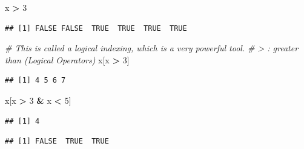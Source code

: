 \documentclass[]{book}
\newenvironment{Shaded}{\begin{snugshade}}{\end{snugshade}}
\newcommand{\CommentTok}[1]{\textcolor[rgb]{0.56,0.35,0.01}{\textit{#1}}}
\newcommand{\DecValTok}[1]{\textcolor[rgb]{0.00,0.00,0.81}{#1}}
\newcommand{\KeywordTok}[1]{\textcolor[rgb]{0.13,0.29,0.53}{\textbf{#1}}}
\newcommand{\NormalTok}[1]{#1}
\newcommand{\OperatorTok}[1]{\textcolor[rgb]{0.81,0.36,0.00}{\textbf{#1}}}
\newcommand{\StringTok}[1]{\textcolor[rgb]{0.31,0.60,0.02}{#1}}
\begin{document}
\begin{Shaded}
\begin{Highlighting}[]
\NormalTok{x }\OperatorTok{>}\StringTok{ }\DecValTok{3}
\end{Highlighting}
\end{Shaded}

\begin{verbatim}
## [1] FALSE FALSE  TRUE  TRUE  TRUE  TRUE
\end{verbatim}

\begin{Shaded}
\begin{Highlighting}[]
\CommentTok{# This is called a logical indexing, which is a very powerful tool.}
\CommentTok{# > : greater than (Logical Operators)}
\NormalTok{x[x }\OperatorTok{>}\StringTok{ }\DecValTok{3}\NormalTok{]   }
\end{Highlighting}
\end{Shaded}

\begin{verbatim}
## [1] 4 5 6 7
\end{verbatim}

\begin{Shaded}
\begin{Highlighting}[]
\NormalTok{x[x }\OperatorTok{>}\StringTok{ }\DecValTok{3} \OperatorTok{&}\StringTok{ }\NormalTok{x }\OperatorTok{<}\StringTok{ }\DecValTok{5}\NormalTok{]}
\end{Highlighting}
\end{Shaded}

\begin{verbatim}
## [1] 4
\end{verbatim}

\begin{Shaded}
\end{Shaded}

\begin{verbatim}
## [1] FALSE  TRUE  TRUE
\end{verbatim}
\end{document}

